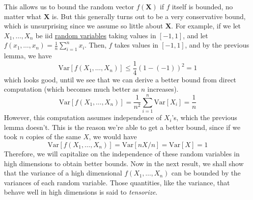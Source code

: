   This allows us to bound the random vector $f(\mathbf{X})$ if $f$ itself is bounded, no matter what $\mathbf{X}$ is. But this generally turns out to be a very conservative bound, which is unsurprising since we assume so little about $\mathbf{X}$. For example, if we let $X_1, \ldots, X_n$ be iid \hyperref[prob-def:random-variable]{random variables} taking values in $[-1, 1]$, and let $f(x_1, \ldots, x_n) = \frac{1}{n} \sum_{i=1}^n x_i$. Then, $f$ takes values in $[-1, 1]$, and by the previous lemma, we have
  \begin{equation}
    \mathrm{Var}[f(X_1, \ldots, X_n)] \leq \frac{1}{4} (1 - (-1))^2 = 1
  \end{equation}
  which looks good, until we see that we can derive a better bound from direct computation (which becomes much better as $n$ increases). 
  \begin{equation}
    \mathrm{Var}[f(X_1, \ldots, X_n)] = \frac{1}{n^2} \sum_{i=1}^n \mathrm{Var}[X_i] = \frac{1}{n}
  \end{equation}
  However, this computation assumes independence of $X_i$'s, which the previous lemma doesn't. This is the reason we're able to get a better bound, since if we took $n$ copies of the same $X$, we would have 
  \begin{equation}
    \mathrm{Var}[f(X_1, \ldots, X_n)] = \mathrm{Var}[n X / n] = \mathrm{Var}[X] = 1
  \end{equation}
  Therefore, we will capitalize on the independence of these random variables in high dimensions to obtain better bounds. Now in the next result, we shall show that the variance of a high dimensional $f(X_1, \ldots, X_n)$ can be bounded by the variances of each random variable. Those quantities, like the variance, that behave well in high dimensions is said to \textit{tensorize}. 

